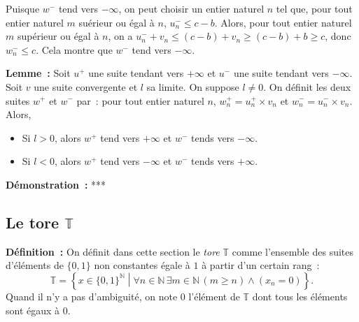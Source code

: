     Puisque $w^-$ tend vers $-\infty$, on peut choisir un entier naturel $n$ tel que, pour tout entier naturel $m$ suérieur ou égal à $n$, $u^-_n \leq c - b$.
    Alors, pour tout entier naturel $m$ supérieur ou égal à $n$, on a $u^-_n + v_n \leq (c - b) + v_n \geq (c - b) + b \geq c$, donc $w^-_n \leq c$.
    Cela montre que $w^-$ tend vers $-\infty$.

    \done

\medskip

\noindent\textbf{Lemme :} Soit $u^+$ une suite tendant vers $+\infty$ et $u^-$ une suite tendant vers $-\infty$.
    Soit $v$ une suite convergente et $l$ sa limite.
    On suppose $l \neq 0$.
    On définit les deux suites $w^+$ et $w^-$ par : pour tout entier naturel $n$, $w^+_n = u^+_n \times v_n$ et $w^-_n = u^ -_n \times v_n$.
    Alors, 
    \begin{itemize}[nosep]
        \item Si $l > 0$, alors $w^+$ tend vers $+\infty$ et $w^-$ tends vers $-\infty$.
        \item Si $l < 0$, alors $w^+$ tend vers $-\infty$ et $w^-$ tends vers $+\infty$.
    \end{itemize}

\medskip

\noindent\textbf{Démonstration :} ***

\subsection{Le tore \texorpdfstring{$\mathbb{T}$}{T}}

\noindent\textbf{Définition :} On définit dans cette section le \emph{tore} $\mathbb{T}$ comme l'ensemble des suites d'éléments de $\lbrace 0, 1 \rbrace$ non constantes égale à $1$ à partir d'un certain rang : 
\begin{equation*}
    \mathbb{T} = \left\lbrace
        x \in \lbrace 0, 1 \rbrace^{\mathbb{N}} 
        \middle\vert
        \forall n \in \mathbb{N} \, \exists m \in \mathbb{N} \, (m \geq n) \wedge (x_n = 0)
    \right\rbrace .
\end{equation*}
Quand il n'y a pas d'ambiguité, on note $0$ l'élément de $\mathbb{T}$ dont tous les éléments sont égaux à $0$.

